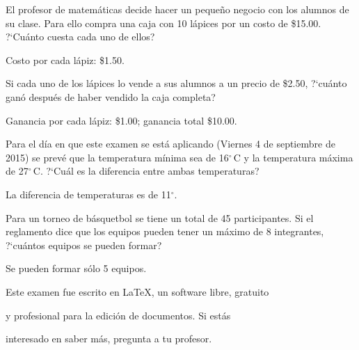 \documentclass[11pt]{article}
\newcommand{\fecha}{Viernes 4 de septiembre de 2015}
\begin{document}
\vspace{1.5cm}

El profesor de matem\'aticas decide hacer un peque\~no negocio con los alumnos
de su clase. Para ello compra una caja con 10 l\'apices por un costo de \$15.00.
?`Cu\'anto cuesta cada uno de ellos?

\vspace{1.5cm}

\qquad \qquad Costo por cada l\'apiz: \$1.50.

\vspace{1.5cm}

Si cada uno de los l\'apices lo vende a sus alumnos a un precio de \$2.50,
?`cu\'anto gan\'o despu\'es de haber vendido la caja completa?

\vspace{1.5cm}

\qquad \qquad Ganancia por cada l\'apiz: \$1.00; ganancia total \$10.00.

\vspace{1.5cm}

Para el d\'ia en que este examen se est\'a aplicando (\fecha) se
prev\'e que la temperatura m\'inima sea de 16$^{\circ}$\,C y la temperatura
m\'axima de 27$^{\circ}$\,C. ?`Cu\'al es la diferencia entre ambas temperaturas?

\vspace{1.5cm}

\qquad \qquad La diferencia de temperaturas es de 11$^{\circ}$.

\vspace{1.5cm}


Para un torneo de b\'asquetbol se tiene un total de 45 participantes. Si el
reglamento dice que los equipos pueden tener un m\'aximo de 8 integrantes,
?`cu\'antos equipos se pueden formar?

\vspace{1.5cm}

\qquad \qquad Se pueden formar s\'olo 5 equipos.

\vspace{1.5cm}

\vfill

{\footnotesize \hfill Este examen fue escrito en \LaTeX, un software libre, gratuito}

{\footnotesize \hfill y profesional para la edici\'on de documentos. Si est\'as }

{\footnotesize \hfill interesado en saber m\'as, pregunta a tu profesor.}
\end{document}
